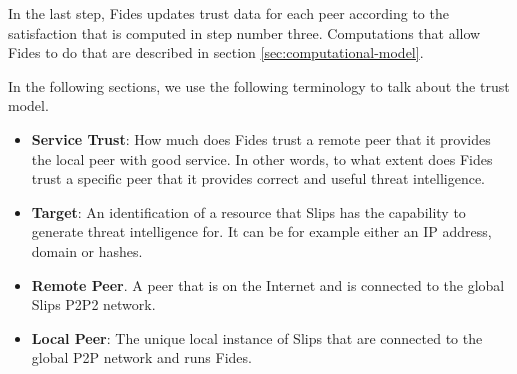 In the last step, Fides updates trust data for each peer according to the satisfaction that is computed in step number three.
Computations that allow Fides to do that are described in section \ref{sec:computational-model}.


\vspace{1.5cm}

\noindent
In the following sections, we use the following terminology to talk about the trust model.

\begin{itemize}
\item \textbf{Service Trust}: How much does Fides trust a remote peer that it provides the local peer with good service. In other words, to what extent does Fides trust a specific peer that it provides correct and useful threat intelligence.

\item \textbf{Target}: An identification of a resource that Slips has the capability to generate threat intelligence for. It can be for example either an IP address, domain or hashes.

\item \textbf{Remote Peer}. A peer that is on the Internet and is connected to the global Slips P2P2 network.

\item \textbf{Local Peer}: The unique local instance of Slips that are connected to the global P2P network and runs Fides.
\end{itemize}










